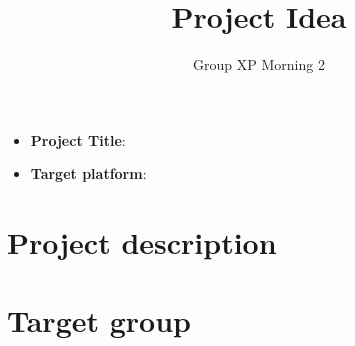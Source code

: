 \documentclass[12pt]{article}
\title{Project Idea}
\author{Group XP Morning 2}
\date{}
\begin{document}
\maketitle
\begin{itemize}
  \item \textbf{Project Title}: 
  \item \textbf{Target platform}: 
\end{itemize}
\section*{Project description}
\section*{Target group}
\end{document}
